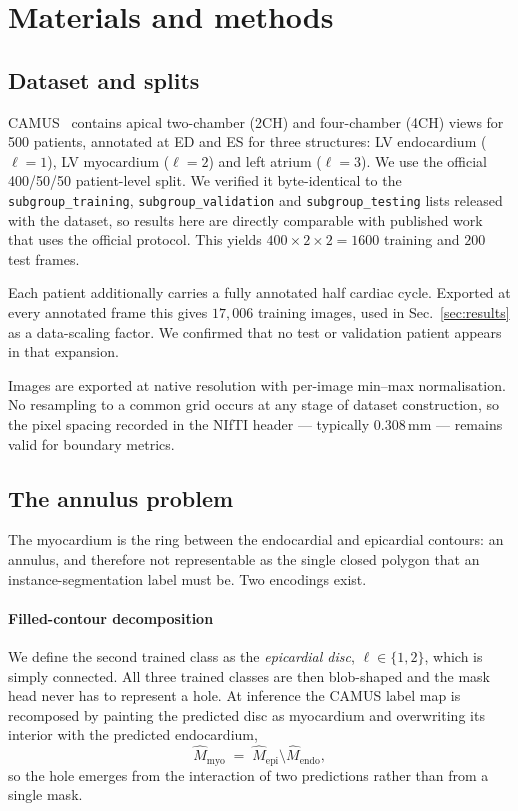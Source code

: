 \section{Materials and methods}
\label{sec:methods}

\subsection{Dataset and splits}

CAMUS~\cite{leclerc2019camus} contains apical two-chamber (2CH) and
four-chamber (4CH) views for 500 patients, annotated at ED and ES for three
structures: LV endocardium ($\ell{=}1$), LV myocardium ($\ell{=}2$) and left
atrium ($\ell{=}3$). We use the official 400/50/50 patient-level split. We
verified it byte-identical to the \texttt{subgroup\_training},
\texttt{subgroup\_validation} and \texttt{subgroup\_testing} lists released with
the dataset, so results here are directly comparable with published work that
uses the official protocol. This yields $400\times2\times2 = 1600$ training and
$200$ test frames.

Each patient additionally carries a fully annotated half cardiac cycle. Exported
at every annotated frame this gives $17{,}006$ training images, used in
Sec.~\ref{sec:results} as a data-scaling factor. We confirmed that no test or
validation patient appears in that expansion.

Images are exported at native resolution with per-image min--max normalisation.
No resampling to a common grid occurs at any stage of dataset construction, so
the pixel spacing recorded in the NIfTI header --- typically $0.308$\,mm ---
remains valid for boundary metrics.

\subsection{The annulus problem}
\label{sec:encoding}

The myocardium is the ring between the endocardial and epicardial contours: an
annulus, and therefore not representable as the single closed polygon that an
instance-segmentation label must be. Two encodings exist.

\paragraph{Filled-contour decomposition} We define the second trained class as
the \emph{epicardial disc}, $\ell \in \{1,2\}$, which is simply connected. All
three trained classes are then blob-shaped and the mask head never has to
represent a hole. At inference the CAMUS label map is recomposed by painting the
predicted disc as myocardium and overwriting its interior with the predicted
endocardium,
\begin{equation}
\hat{M}_{\text{myo}} \;=\; \hat{M}_{\text{epi}} \setminus \hat{M}_{\text{endo}},
\label{eq:decomp}
\end{equation}
so the hole emerges from the interaction of two predictions rather than from a
single mask.

